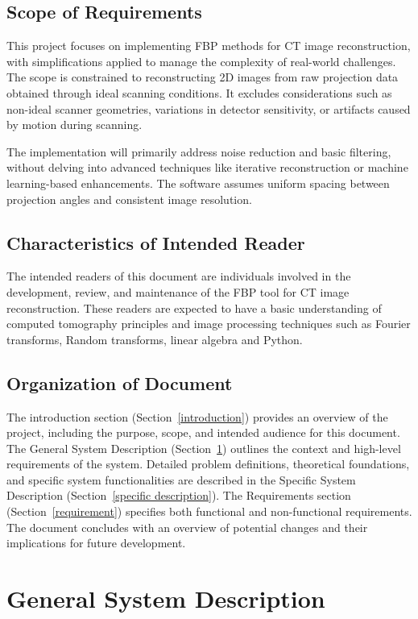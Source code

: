 \documentclass[12pt]{article}
\begin{document}
\subsection{Scope of Requirements}
This project focuses on implementing FBP methods for CT image reconstruction,
with simplifications applied to manage the complexity of real-world challenges.
The scope is constrained to reconstructing 2D images from raw projection data
obtained through ideal scanning conditions. It excludes considerations such as
non-ideal scanner geometries, variations in detector sensitivity, or artifacts
caused by motion during scanning.

The implementation will primarily address noise reduction and basic filtering,
without delving into advanced techniques like iterative reconstruction or
machine learning-based enhancements. The software assumes uniform spacing
between projection angles and consistent image resolution.

\subsection{Characteristics of Intended Reader} \label{sec_IntendedReader}
The intended readers of this document are individuals involved in the development,
review, and maintenance of the FBP tool for CT image reconstruction. These
readers are expected to have a basic understanding of computed tomography
principles and image processing techniques such as Fourier transforms, Random
transforms, linear algebra and Python.

\subsection{Organization of Document}
The introduction section (Section~\ref{introduction}) provides an overview of
the project, including the purpose, scope, and intended audience for this
document. The General System Description (Section~\ref{general description}) outlines
the context and high-level requirements of the system. Detailed problem
definitions, theoretical foundations, and specific system functionalities are
described in the Specific System Description (Section~\ref{specific description}). The
Requirements section (Section~\ref{requirement}) specifies both functional
and non-functional requirements. The document concludes with an overview of
potential changes and their implications for future development.

\section{General System Description} \label{general description}
\end{document}
